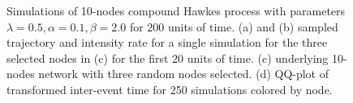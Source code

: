 \documentclass{juliacon}
\numberwithin{equation}{section}
\begin{document}
\begin{figure}
\hfil
{}
\hfil
{}
\caption{Simulations of 10-nodes compound Hawkes process with parameters \( \lambda = 0.5 , \alpha = 0.1 , \beta = 2.0 \) for \( 200 \) units of time. (a) and (b) sampled trajectory and intensity rate for a single simulation for the three selected nodes in (c) for the first \( 20 \) units of time. (c) underlying 10-nodes network with three random nodes selected. (d) QQ-plot of transformed inter-event time for 250 simulations colored by node.}
\label{fig:hawkes}
\end{figure}
\end{document}
